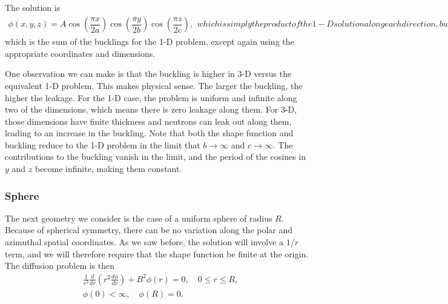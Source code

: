 The solution is
\begin{subequations}
\begin{align}
  \phi(x,y,z) = A \cos\left( \dfrac{\pi x}{2 a} \right) \cos\left( \dfrac{\pi y}{2 b} \right) \cos\left( \dfrac{\pi z}{2 c} \right),
\end{align}
which is simply the product of the 1-D solution along each direction, but with the appropriate coordinates. The buckling is
\begin{align}
  B^2 = \left( \dfrac{\pi}{2a} \right)^2 + \left( \dfrac{\pi}{2b} \right)^2 + \left( \dfrac{\pi}{2c} \right)^2,
\end{align}
\end{subequations}
which is the sum of the bucklings for the 1-D problem, except again using the appropriate coordinates and dimensions.

One observation we can make is that the buckling is higher in 3-D versus the equivalent 1-D problem. This makes physical sense. The larger the buckling, the higher the leakage. For the 1-D case, the problem is uniform and infinite along two of the dimensions, which means there is zero leakage along them. For 3-D, those dimensions have finite thickness and neutrons can leak out along them, leading to an increase in the buckling. Note that both the shape function and buckling reduce to the 1-D problem in the limit that $b \rightarrow \infty$ and $c \rightarrow \infty$. The contributions to the buckling vanish in the limit, and the period of the cosines in $y$ and $z$ become infinite, making them constant.

\subsubsection{Sphere}

The next geometry we consider is the case of a uniform sphere of radius $R$. Because of spherical symmetry, there can be no variation along the polar and azimuthal spatial coordinates. As we saw before, the solution will involve a $1/r$ term, and we will therefore require that the shape function be finite at the origin. The diffusion problem is then
\begin{subequations}
\begin{align}
  &\frac{1}{r^2} \frac{d}{dr} \left( r^2 \frac{d\phi}{dr} \right) + B^2 \phi(r) = 0, \quad 0 \le r \le R, \\
  &\phi(0) < \infty, \quad \phi(R) = 0.
\end{align}
\end{subequations}

